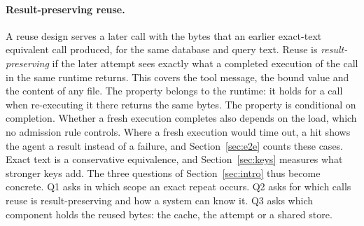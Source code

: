 \paragraph{Result-preserving reuse.}
A reuse design serves a later call with the bytes that an earlier exact-text equivalent call produced, for the same
database and query text. Reuse is \emph{result-preserving} if the later attempt sees exactly what a completed execution
of the call in the same runtime returns. This covers the tool message, the bound value and the content of any file.
The property belongs to the runtime: it holds for a call when re-executing it there returns the same bytes. The
property is conditional on completion. Whether a fresh execution completes also depends on the load, which no
admission rule controls. Where a fresh execution would time out, a hit shows the agent a result instead of a failure,
and Section~\ref{sec:e2e} counts these cases. Exact text is a conservative equivalence, and Section~\ref{sec:keys}
measures what stronger keys add. The three questions of Section~\ref{sec:intro} thus become concrete. Q1 asks in
which scope an exact repeat occurs. Q2 asks for which calls reuse is result-preserving and how a system can know it.
Q3 asks which component holds the reused bytes: the cache, the attempt or a shared store.
